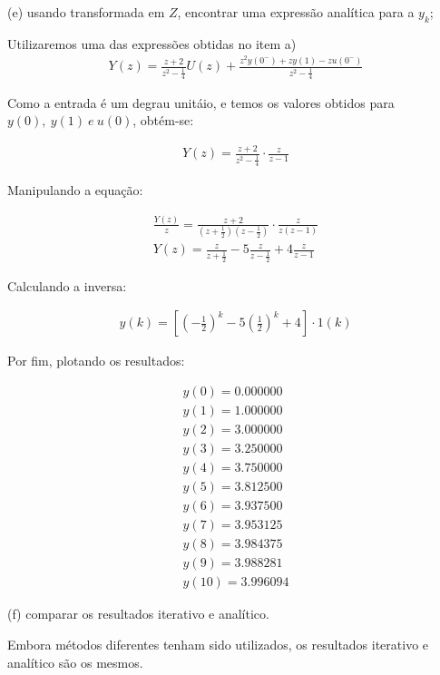 \documentclass[10pt]{article}
\begin{document}
(e) usando transformada em $Z$, encontrar uma expressão analítica para a $y_k$;

Utilizaremos uma das expressões obtidas no item a)
\begin{align*}
    Y(z) = \frac{z + 2}{z^2 - \frac{1}{4}}U(z) + \frac{z^2y(0^-)+zy(1)-zu(0^-)}{z^2 - \frac{1}{4}}
\end{align*}

Como a entrada é um degrau unitáio, e temos os valores obtidos para $ y(0),\ y(1)\ e\ u(0) $, obtém-se:

\begin{align*}
    Y(z) = \frac{z + 2}{z^2 - \frac{1}{4}} \cdot \frac{z}{z-1}
\end{align*}

Manipulando a equação:

\begin{align*}
    \frac{Y(z)}{z} = \frac{z + 2}{(z+\frac{1}{2})(z-\frac{1}{2})} \cdot \frac{z}{z(z-1)}\\
    Y(z) = \frac{z}{z+\frac{1}{2}} - 5\frac{z}{z-\frac{1}{2}} + 4\frac{z}{z-1}
\end{align*}

Calculando a inversa:

\begin{align*}
    y(k) = \left[\left(-\frac{1}{2}\right)^k - 5\left(\frac{1}{2}\right)^k + 4\right] \cdot 1(k)
\end{align*}

Por fim, plotando os resultados:

\begin{align*}
    y(0) = 0.000000\\
    y(1) = 1.000000\\
    y(2) = 3.000000\\
    y(3) = 3.250000\\
    y(4) = 3.750000\\
    y(5) = 3.812500\\
    y(6) = 3.937500\\
    y(7) = 3.953125\\
    y(8) = 3.984375\\
    y(9) = 3.988281\\
    y(10)= 3.996094
\end{align*}

(f) comparar os resultados iterativo e analítico.

Embora métodos diferentes tenham sido utilizados, os resultados iterativo e analítico são os mesmos.
\end{document}
